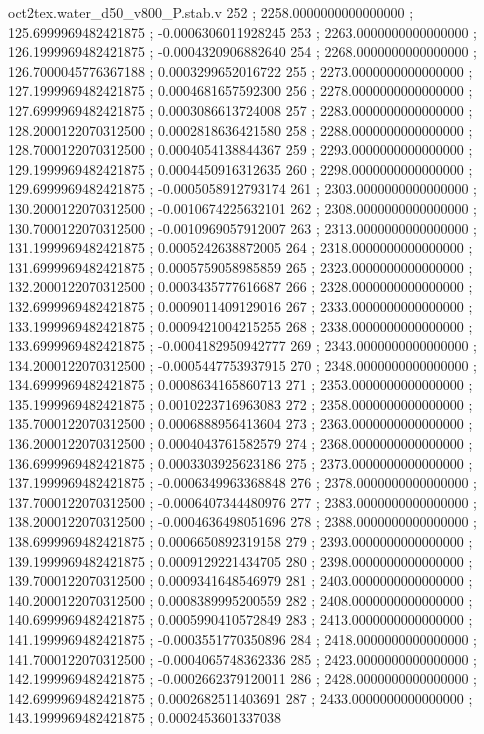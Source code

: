 \begin{filecontents}[overwrite]{oct2tex.water_d50_v800_P.stab.v}
252 ; 2258.0000000000000000 ; 125.6999969482421875 ; -0.0006306011928245
253 ; 2263.0000000000000000 ; 126.1999969482421875 ; -0.0004320906882640
254 ; 2268.0000000000000000 ; 126.7000045776367188 ; 0.0003299652016722
255 ; 2273.0000000000000000 ; 127.1999969482421875 ; 0.0004681657592300
256 ; 2278.0000000000000000 ; 127.6999969482421875 ; 0.0003086613724008
257 ; 2283.0000000000000000 ; 128.2000122070312500 ; 0.0002818636421580
258 ; 2288.0000000000000000 ; 128.7000122070312500 ; 0.0004054138844367
259 ; 2293.0000000000000000 ; 129.1999969482421875 ; 0.0004450916312635
260 ; 2298.0000000000000000 ; 129.6999969482421875 ; -0.0005058912793174
261 ; 2303.0000000000000000 ; 130.2000122070312500 ; -0.0010674225632101
262 ; 2308.0000000000000000 ; 130.7000122070312500 ; -0.0010969057912007
263 ; 2313.0000000000000000 ; 131.1999969482421875 ; 0.0005242638872005
264 ; 2318.0000000000000000 ; 131.6999969482421875 ; 0.0005759058985859
265 ; 2323.0000000000000000 ; 132.2000122070312500 ; 0.0003435777616687
266 ; 2328.0000000000000000 ; 132.6999969482421875 ; 0.0009011409129016
267 ; 2333.0000000000000000 ; 133.1999969482421875 ; 0.0009421004215255
268 ; 2338.0000000000000000 ; 133.6999969482421875 ; -0.0004182950942777
269 ; 2343.0000000000000000 ; 134.2000122070312500 ; -0.0005447753937915
270 ; 2348.0000000000000000 ; 134.6999969482421875 ; 0.0008634165860713
271 ; 2353.0000000000000000 ; 135.1999969482421875 ; 0.0010223716963083
272 ; 2358.0000000000000000 ; 135.7000122070312500 ; 0.0006888956413604
273 ; 2363.0000000000000000 ; 136.2000122070312500 ; 0.0004043761582579
274 ; 2368.0000000000000000 ; 136.6999969482421875 ; 0.0003303925623186
275 ; 2373.0000000000000000 ; 137.1999969482421875 ; -0.0006349963368848
276 ; 2378.0000000000000000 ; 137.7000122070312500 ; -0.0006407344480976
277 ; 2383.0000000000000000 ; 138.2000122070312500 ; -0.0004636498051696
278 ; 2388.0000000000000000 ; 138.6999969482421875 ; 0.0006650892319158
279 ; 2393.0000000000000000 ; 139.1999969482421875 ; 0.0009129221434705
280 ; 2398.0000000000000000 ; 139.7000122070312500 ; 0.0009341648546979
281 ; 2403.0000000000000000 ; 140.2000122070312500 ; 0.0008389995200559
282 ; 2408.0000000000000000 ; 140.6999969482421875 ; 0.0005990410572849
283 ; 2413.0000000000000000 ; 141.1999969482421875 ; -0.0003551770350896
284 ; 2418.0000000000000000 ; 141.7000122070312500 ; -0.0004065748362336
285 ; 2423.0000000000000000 ; 142.1999969482421875 ; -0.0002662379120011
286 ; 2428.0000000000000000 ; 142.6999969482421875 ; 0.0002682511403691
287 ; 2433.0000000000000000 ; 143.1999969482421875 ; 0.0002453601337038

\end{filecontents}
